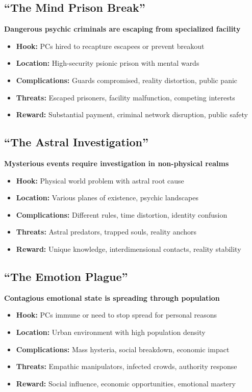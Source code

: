 \documentclass[11pt,twoside]{article}
\begin{document}
\subsection{``The Mind Prison Break''}
\textbf{Dangerous psychic criminals are escaping from specialized facility}
\begin{itemize}[leftmargin=*]
    \item \textbf{Hook:} PCs hired to recapture escapees or prevent breakout
    \item \textbf{Location:} High-security psionic prison with mental wards
    \item \textbf{Complications:} Guards compromised, reality distortion, public panic
    \item \textbf{Threats:} Escaped prisoners, facility malfunction, competing interests
    \item \textbf{Reward:} Substantial payment, criminal network disruption, public safety
\end{itemize}

\subsection{``The Astral Investigation''}
\textbf{Mysterious events require investigation in non-physical realms}
\begin{itemize}[leftmargin=*]
    \item \textbf{Hook:} Physical world problem with astral root cause
    \item \textbf{Location:} Various planes of existence, psychic landscapes
    \item \textbf{Complications:} Different rules, time distortion, identity confusion
    \item \textbf{Threats:} Astral predators, trapped souls, reality anchors
    \item \textbf{Reward:} Unique knowledge, interdimensional contacts, reality stability
\end{itemize}

\subsection{``The Emotion Plague''}
\textbf{Contagious emotional state is spreading through population}
\begin{itemize}[leftmargin=*]
    \item \textbf{Hook:} PCs immune or need to stop spread for personal reasons
    \item \textbf{Location:} Urban environment with high population density
    \item \textbf{Complications:} Mass hysteria, social breakdown, economic impact
    \item \textbf{Threats:} Empathic manipulators, infected crowds, authority response
    \item \textbf{Reward:} Social influence, economic opportunities, emotional mastery
\end{itemize}
\end{document}
